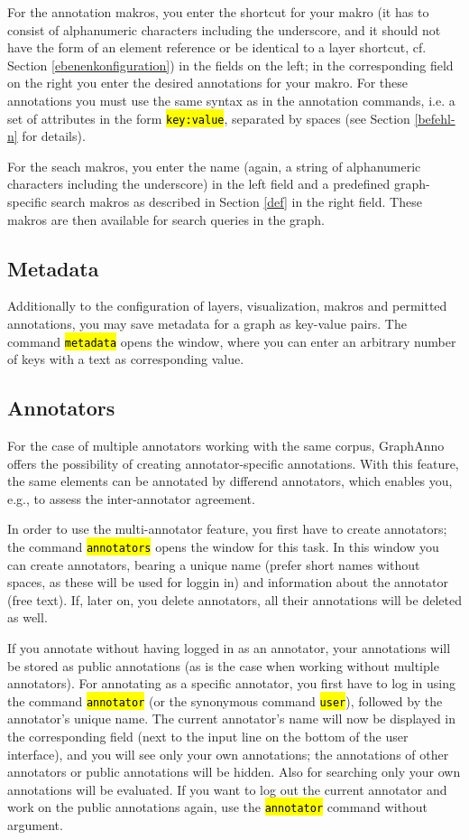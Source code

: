 \documentclass[12pt]{scrartcl}
\newcommand{\code}[1]{\hl{\texttt{#1}}}
\begin{document}
For the annotation makros, you enter the shortcut for your makro (it has to consist of alphanumeric characters including the underscore, and it should not have the form of an element reference or be identical to a layer shortcut, cf. Section \ref{ebenenkonfiguration}) in the fields on the left; in the corresponding field on the right you enter the desired annotations for your makro.
For these annotations you must use the same syntax as in the annotation commands, i.e. a set of attributes in the form \code{key:value}, separated by spaces (see Section \ref{befehl-n} for details).

For the seach makros, you enter the name (again, a string of alphanumeric characters including the underscore) in the left field and a predefined graph-specific search makros as described in Section \ref{def} in the right field.
These makros are then available for search queries in the graph.


\subsection{Metadata}

Additionally to the configuration of layers, visualization, makros and permitted annotations, you may save metadata for a graph as key-value pairs.
The command \code{metadata} opens the window, where you can enter an arbitrary number of keys with a text as corresponding value.


\subsection{Annotators}\label{annotatoren}

For the case of multiple annotators working with the same corpus, GraphAnno offers the possibility of creating annotator-specific annotations.
With this feature, the same elements can be annotated by differend annotators, which enables you, e.g., to assess the inter-annotator agreement.

In order to use the multi-annotator feature, you first have to create annotators; the command \code{annotators} opens the window for this task.
In this window you can create annotators, bearing a unique name (prefer short names without spaces, as these will be used for loggin in) and information about the annotator (free text).
If, later on, you delete annotators, all their annotations will be deleted as well.

If you annotate without having logged in as an annotator, your annotations will be stored as public annotations (as is the case when working without multiple annotators).
For annotating as a specific annotator, you first have to log in using the command \code{annotator} (or the synonymous command \code{user}), followed by the annotator’s unique name.
The current annotator’s name will now be displayed in the corresponding field (next to the input line on the bottom of the user interface), and you will see only your own annotations; the annotations of other annotators or public annotations will be hidden.
Also for searching only your own annotations will be evaluated.
If you want to log out the current annotator and work on the public annotations again, use the \code{annotator} command without argument.
\end{document}
